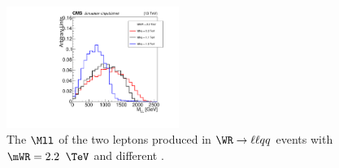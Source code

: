 \begin{figure}[h]
	\centering
	\includegraphics[width=0.5\textwidth]{figures/dileptonMassFromGenLeptonsFromFstAndScdHvyPtcl_MWR_2200_several_MNu_private.pdf}
	\caption{The $\Mll$ of the two leptons produced in $\WR \rightarrow \ell\ell qq$ events with $\mWR = 2.2$ $\TeV$ and 
	different \mnul.}
	\label{fig:wrMllVarMNu}
\end{figure}

\clearpage



